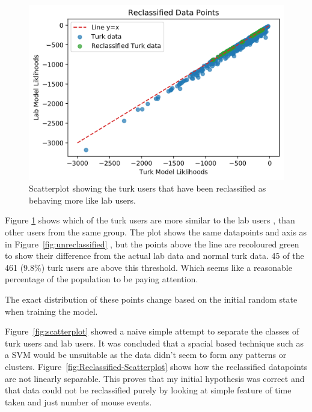 \documentclass{article}
\begin{document}
\begin{figure}[ht!]
    \centering
    \includegraphics[scale=0.5]{Images/Reclassified-Data.png}
    \caption{Scatterplot showing the turk users that have been reclassified as behaving more like lab users. }
    \label{fig:Reclassified}
\end{figure}

Figure \ref{fig:Reclassified} shows which of the turk users are more similar to the lab users
, than other users from the same group. 
The plot shows the same datapoints and axis as in Figure~\ref{fig:unreclassified}
, but the points above the line are recoloured green to show their difference from the actual lab data and normal turk data. 
45 of the 461 (9.8\%) turk users are above this threshold. 
Which seems like a reasonable percentage of the population to be paying attention. 

The exact distribution of these points change based on the initial random state when training the model.

Figure~\ref{fig:scatterplot} showed a naive simple attempt to separate the classes of turk users and lab users.
It was concluded that a spacial based technique such as a SVM would be unsuitable as the data didn't seem to form any patterns or clusters.
Figure~\ref{fig:Reclassified-Scatterplot} shows how the reclassified datapoints are not linearly separable.
This proves that my initial hypothesis was correct and that data could not be reclassified purely by looking at simple feature of time taken and just number of mouse events.
\end{document}

